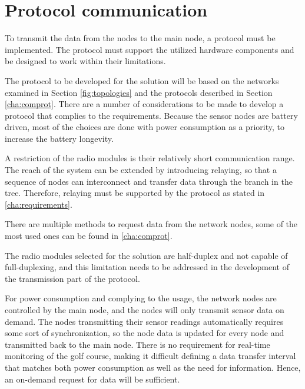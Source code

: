 \section{Protocol communication}\label{cha:protocolDesign}
To transmit the data from the nodes to the main node, a protocol must be implemented.
The protocol must support the utilized hardware components and be designed to work within their limitations. 

The protocol to be developed for the solution will be based on the networks examined in Section \ref{fig:topologies} and the protocols described in Section \ref{cha:comprot}.
There are a number of considerations to be made to develop a protocol that complies to the requirements.
Because the sensor nodes are battery driven, most of the choices are done with power consumption as a priority, to increase the battery longevity.

A restriction of the radio modules is their relatively short communication range. The reach of the system can be extended by introducing relaying, so that a sequence of nodes can interconnect and transfer data through the branch in the tree. Therefore, relaying must be supported by the protocol as stated in \ref{cha:requirements}. 

There are multiple methods to request data from the network nodes, some of the most used ones can be found in \ref{cha:comprot}. 

The radio modules selected for the solution are half-duplex and not capable of full-duplexing, and this limitation needs to be addressed in the development of the transmission part of the protocol. 

For power consumption and complying to the usage, the network nodes are controlled by the main node, and the nodes will only transmit sensor data on demand.
The nodes transmitting their sensor readings automatically requires some sort of synchronization, so the node data is updated for every node and transmitted back to the main node. 
There is no requirement for real-time monitoring of the golf course, making it difficult defining a data transfer interval that matches both power consumption as well as the need for information.
Hence, an on-demand request for data will be sufficient.

